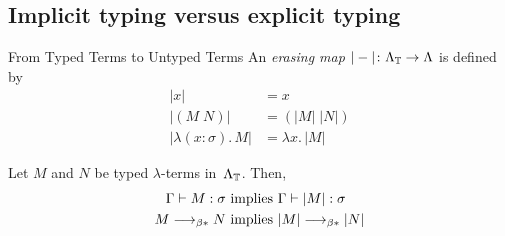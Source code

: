 \subsection{Implicit typing versus explicit typing}

\begin{frame}{From Typed Terms to Untyped Terms}
  An \emph{erasing map} $|-|\colon \Lambda_{\mathbb{T}} \to \Lambda$ is defined by
  \begin{align*}
    |x| & = x \\
    |(M\; N)| & = (|M|\;|N|) \\
    |\lambda (x:\sigma).\, M| & = \lambda x.\, |M|
  \end{align*}
\begin{proposition}\label{prop:type-erasure}
  Let $M$ and $N$ be typed $\lambda$-terms in~$\Lambda_{\mathbb{T}}$. Then, 
  \begin{align*}
    \Gamma  \vdash M : \sigma & \text{ implies } \Gamma \vdash |M| :
    \sigma \\ 
    M \longrightarrow_{\beta*} N & \text{ implies } |M| \longrightarrow_{\beta*} |N|
  \end{align*}
\end{proposition}
\end{frame}

